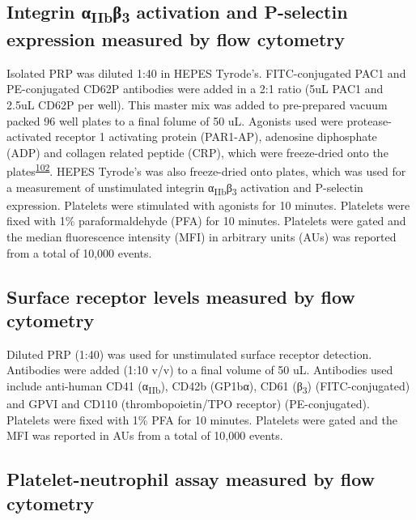 \documentclass[11pt,twoside]{bristolthesis}
\begin{document}
\hypertarget{integrin-ux3b1iibux3b23-activation-and-p-selectin-expression-measured-by-flow-cytometry}{%
\subsection{\texorpdfstring{Integrin α\textsubscript{IIb}β\textsubscript{3} activation and P-selectin expression measured by flow cytometry}{Integrin αIIbβ3 activation and P-selectin expression measured by flow cytometry}}\label{integrin-ux3b1iibux3b23-activation-and-p-selectin-expression-measured-by-flow-cytometry}}

Isolated PRP was diluted 1:40 in HEPES Tyrode's. FITC-conjugated PAC1 and PE-conjugated CD62P antibodies were added in a 2:1 ratio (5uL PAC1 and 2.5uL CD62P per well). This master mix was added to pre-prepared vacuum packed 96 well plates to a final folume of 50 uL. Agonists used were protease-activated receptor 1 activating protein (PAR1-AP), adenosine diphosphate (ADP) and collagen related peptide (CRP), which were freeze-dried onto the plates\textsuperscript{\protect\hyperlink{ref-Chan2018}{102}}. HEPES Tyrode's was also freeze-dried onto plates, which was used for a measurement of unstimulated integrin α\textsubscript{IIb}β\textsubscript{3} activation and P-selectin expression. Platelets were stimulated with agonists for 10 minutes. Platelets were fixed with 1\% paraformaldehyde (PFA) for 10 minutes. Platelets were gated and the median fluorescence intensity (MFI) in arbitrary units (AUs) was reported from a total of 10,000 events.

\hypertarget{surface-receptor-levels-measured-by-flow-cytometry}{%
\subsection{Surface receptor levels measured by flow cytometry}\label{surface-receptor-levels-measured-by-flow-cytometry}}

Diluted PRP (1:40) was used for unstimulated surface receptor detection. Antibodies were added (1:10 v/v) to a final volume of 50 uL. Antibodies used include anti-human CD41 (α\textsubscript{IIb}), CD42b (GP1bα), CD61 (β\textsubscript{3}) (FITC-conjugated) and GPVI and CD110 (thrombopoietin/TPO receptor) (PE-conjugated). Platelets were fixed with 1\% PFA for 10 minutes. Platelets were gated and the MFI was reported in AUs from a total of 10,000 events.

\hypertarget{platelet-neutrophil-assay-measured-by-flow-cytometry}{%
\subsection{Platelet-neutrophil assay measured by flow cytometry}\label{platelet-neutrophil-assay-measured-by-flow-cytometry}}
\end{document}
